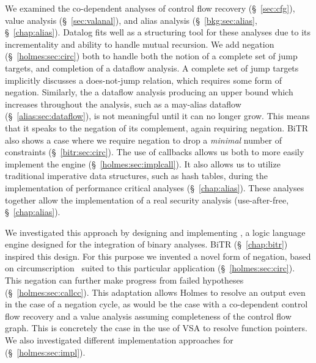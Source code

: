We examined the co-dependent analyses of control flow recovery (\S~\ref{sec:cfg}), value analysis (\S~\ref{sec:valanal}), and alias analysis (\S~\ref{bkg:sec:alias}, \S~\ref{chap:alias}).
Datalog fits well as a structuring tool for these analyses due to its incrementality and ability to handle mutual recursion.
We add negation (\S~\ref{holmes:sec:circ}) both to handle both the notion of a complete set of jump targets, and completion of a dataflow analysis.
A complete set of jump targets implicitly discusses a does-not-jump relation, which requires some form of negation.
Similarly, the a dataflow analysis producing an upper bound which increases throughout the analysis, such as a may-alias dataflow (\S~\ref{alias:sec:dataflow}), is not meaningful until it can no longer grow.
This means that it speaks to the negation of its complement, again requiring negation.
{\sc BiTR} also shows a case where we require negation to drop a \emph{minimal} number of constraints (\S~\ref{bitr:sec:circ}).
The use of callbacks allows us both to more easily implement the engine (\S~\ref{holmes:sec:implcall}).
It also allows us to utilize traditional imperative data structures, such as hash tables, during the implementation of performance critical analyses (\S~\ref{chap:alias}). 
These analyses together allow the implementation of a real security analysis (use-after-free, \S~\ref{chap:alias}).

We investigated this approach by designing and implementing \sysname, a logic language engine designed for the integration of binary analyses.
BiTR (\S~\ref{chap:bitr}) inspired this design.
For this purpose we invented a novel form of negation, based on circumscription~\cite{circumscription} suited to this particular application (\S~\ref{holmes:sec:circ}).
This negation can further make progress from failed hypotheses (\S~\ref{holmes:sec:callcc}).
This adaptation allows Holmes to resolve an output even in the case of a negation cycle, as would be the case with a co-dependent control flow recovery and a value analysis assuming completeness of the control flow graph.
This is concretely the case in the use of VSA to resolve function pointers.
We also investigated different implementation approaches for \sysname (\S~\ref{holmes:sec:impl}).

